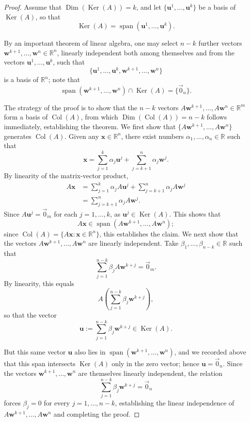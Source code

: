 \begin{proof}
Assume that $\operatorname{Dim}(\operatorname{Ker}(A)) = k$, and let $\{\mathbf{u}^1, \dots, \mathbf{u}^k\}$ be a basis of $\operatorname{Ker}(A)$, so that
\[
\operatorname{Ker}(A) = \operatorname{span}(\mathbf{u}^1, \dots, \mathbf{u}^k).
\]

By an important theorem of linear algebra, one may select $n-k$ further vectors $\mathbf{w}^{k+1}, \dots, \mathbf{w}^n \in \mathbb{R}^n$, linearly independent both among themselves and from the vectors $\mathbf{u}^1, \dots, \mathbf{u}^k$, such that
\[
\{\mathbf{u}^1, \dots, \mathbf{u}^k, \mathbf{w}^{k+1}, \dots, \mathbf{w}^n\}
\]
 is a basis of $\mathbb{R}^n$; note that
\[
\operatorname{span}(\mathbf{w}^{k+1}, \dots, \mathbf{w}^n) \cap \operatorname{Ker}(A) = \{\vec{0}_n\}.
\]

The strategy of the proof is to show that the $n-k$ vectors $A\mathbf{w}^{k+1}, \dots, A\mathbf{w}^n \in \mathbb{R}^m$ form a basis of $\operatorname{Col}(A)$, from which $\operatorname{Dim}(\operatorname{Col}(A)) = n-k$ follows immediately, establishing the theorem. We first show that $\{A\mathbf{w}^{k+1}, \dots, A\mathbf{w}^n\}$ generates $\operatorname{Col}(A)$. Given any $\mathbf{x} \in \mathbb{R}^n$, there exist numbers $\alpha_1, \dots, \alpha_n \in \mathbb{R}$ such that
\[
\mathbf{x} = \sum_{j=1}^{k} \alpha_j \mathbf{u}^j + \sum_{j=k+1}^{n} \alpha_j \mathbf{w}^j.
\]
By linearity of the matrix-vector product,
\[
\begin{aligned}
A\mathbf{x} &= \sum_{j=1}^{k} \alpha_j A\mathbf{u}^j + \sum_{j=k+1}^{n} \alpha_j A\mathbf{w}^j \\
&= \sum_{j=k+1}^{n} \alpha_j A\mathbf{w}^j.
\end{aligned}
\]
Since $A\mathbf{u}^j = \vec{0}_m$ for each $j = 1, \dots, k$, as $\mathbf{u}^j \in \operatorname{Ker}(A)$. This shows that
\[
A\mathbf{x} \in \operatorname{span}(A\mathbf{w}^{k+1}, \dots, A\mathbf{w}^n);
\] since $\operatorname{Col}(A) = \{A\mathbf{x} : \mathbf{x} \in \mathbb{R}^n\}$, this establishes the claim. We next show that the vectors $A\mathbf{w}^{k+1}, \dots, A\mathbf{w}^n$ are linearly independent. Take $\beta_1, \dots, \beta_{n-k} \in \mathbb{R}$ such that
\[
\sum_{j=1}^{n-k} \beta_j A\mathbf{w}^{k+j} = \vec{0}_m.
\]
By linearity, this equals
\[
A( \sum_{j=1}^{n-k} \beta_j \mathbf{w}^{k+j} ),
\]
so that the vector
\[
\mathbf{u} := \sum_{j=1}^{n-k} \beta_j \mathbf{w}^{k+j} \in \operatorname{Ker}(A).
\]

But this same vector $\mathbf{u}$ also lies in $\operatorname{span}(\mathbf{w}^{k+1}, \dots, \mathbf{w}^n)$, and we recorded above that this span intersects $\operatorname{Ker}(A)$ only in the zero vector; hence $\mathbf{u} = \vec{0}_n$. Since the vectors $\mathbf{w}^{k+1}, \dots, \mathbf{w}^n$ are themselves linearly independent, the relation \[
\sum_{j=1}^{n-k} \beta_j \mathbf{w}^{k+j} = \vec{0}_n
\] forces $\beta_j = 0$ for every $j = 1, \dots, n-k$, establishing the linear independence of $A\mathbf{w}^{k+1},\allowbreak \dots, A\mathbf{w}^n$ and completing the proof.
\end{proof}


